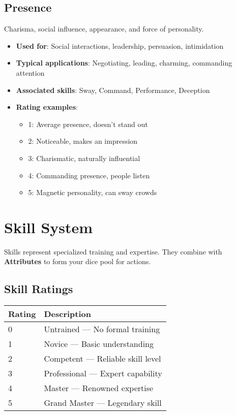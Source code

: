 \begin{multicols}{2}
\subsection*{Presence}

Charisma, social influence, appearance, and force of personality.
\begin{itemize}
\item \textbf{Used for}: Social interactions, leadership, persuasion, intimidation
\item \textbf{Typical applications}: Negotiating, leading, charming, commanding attention
\item \textbf{Associated skills}: Sway, Command, Performance, Deception
\item \textbf{Rating examples}:
  \begin{itemize}
    \item 1: Average presence, doesn't stand out
    \item 2: Noticeable, makes an impression
    \item 3: Charismatic, naturally influential
    \item 4: Commanding presence, people listen
    \item 5: Magnetic personality, can sway crowds
  \end{itemize}
\end{itemize}

\section{Skill System}

Skills represent specialized training and expertise. They combine with \textbf{Attributes} to form your dice pool for actions.

\subsection*{Skill Ratings}
\begin{center}
\small
\begin{tabular}{ll}
\toprule
\textbf{Rating} & \textbf{Description} \\
\midrule
0 & Untrained --- No formal training \\
1 & Novice --- Basic understanding \\
2 & Competent --- Reliable skill level \\
3 & Professional --- Expert capability \\
4 & Master --- Renowned expertise \\
5 & Grand Master --- Legendary skill \\
\bottomrule
\end{tabular}
\end{center}


\end{multicols}
